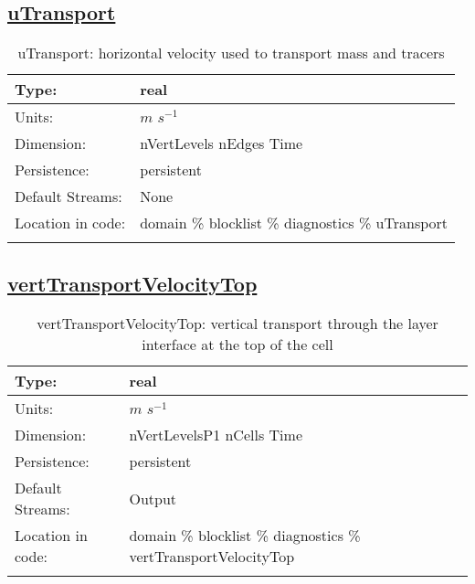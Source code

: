 \subsection[uTransport]{\hyperref[sec:var_tab_diagnostics]{uTransport}}
\label{subsec:var_sec_diagnostics_uTransport}
\begin{center}
\begin{longtable}{| p{2.0in} | p{4.0in} |}
        \hline 
        Type: & real \\
        \hline 
        Units: & $m$ $s^{-1}$ \\
        \hline 
        Dimension: & nVertLevels nEdges Time \\
        \hline 
        Persistence: & persistent \\
        \hline 
		 Default Streams: & None \\
        \hline 
		 Location in code: & domain \% blocklist \% diagnostics \% uTransport \\
		 \hline 
    \caption{uTransport: horizontal velocity used to transport mass and tracers}
\end{longtable}
\end{center}
\subsection[vertTransportVelocityTop]{\hyperref[sec:var_tab_diagnostics]{vertTransportVelocityTop}}
\label{subsec:var_sec_diagnostics_vertTransportVelocityTop}
\begin{center}
\begin{longtable}{| p{2.0in} | p{4.0in} |}
        \hline 
        Type: & real \\
        \hline 
        Units: & $m$ $s^{-1}$ \\
        \hline 
        Dimension: & nVertLevelsP1 nCells Time \\
        \hline 
        Persistence: & persistent \\
        \hline 
		 Default Streams: & Output  \\
        \hline 
		 Location in code: & domain \% blocklist \% diagnostics \% vertTransportVelocityTop \\
		 \hline 
    \caption{vertTransportVelocityTop: vertical transport through the layer interface at the top of the cell}
\end{longtable}
\end{center}
